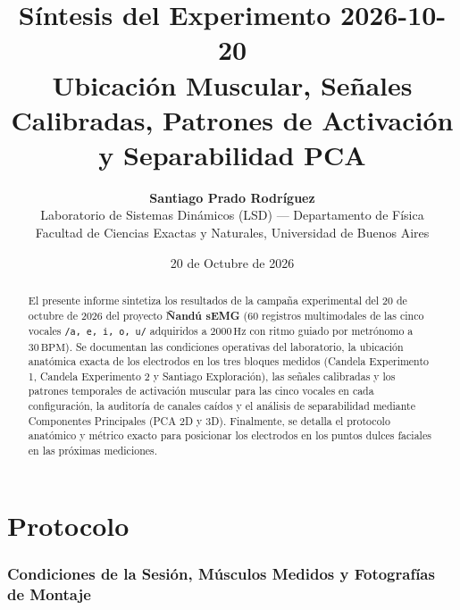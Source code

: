 \documentclass[11pt, a4paper]{article}
\title{
    \vspace{-1.4cm}
    \textbf{\Large Síntesis del Experimento 2026-10-20}\\[0.3em]
    \large Ubicación Muscular, Señales Calibradas, Patrones de Activación y Separabilidad PCA
}
\author{
    \textbf{Santiago Prado Rodríguez}\\[0.25em]
    \normalsize Laboratorio de Sistemas Dinámicos (LSD) --- Departamento de Física\\
    \normalsize Facultad de Ciencias Exactas y Naturales, Universidad de Buenos Aires
}
\date{20 de Octubre de 2026}
\begin{document}
\maketitle

\begin{abstract}
\noindent El presente informe sintetiza los resultados de la campaña experimental del 20 de octubre de 2026 del proyecto \textbf{Ñandú sEMG} (60 registros multimodales de las cinco vocales \texttt{/a, e, i, o, u/} adquiridos a $2000\,\text{Hz}$ con ritmo guiado por metrónomo a $30\,\text{BPM}$). Se documentan las condiciones operativas del laboratorio, la ubicación anatómica exacta de los electrodos en los tres bloques medidos (Candela Experimento 1, Candela Experimento 2 y Santiago Exploración), las señales calibradas y los patrones temporales de activación muscular para las cinco vocales en cada configuración, la auditoría de canales caídos y el análisis de separabilidad mediante Componentes Principales (PCA 2D y 3D). Finalmente, se detalla el protocolo anatómico y métrico exacto para posicionar los electrodos en los puntos dulces faciales en las próximas mediciones.
\end{abstract}

\tableofcontents
\newpage

\part{Protocolo}
\section{Condiciones de la Sesión, Músculos Medidos y Fotografías de Montaje}
\end{document}
